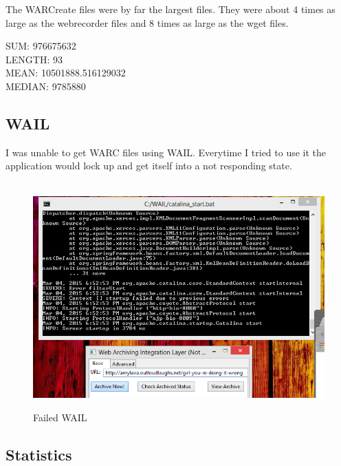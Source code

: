 \documentclass[12pt]{article}
\begin{document}
The WARCreate files were by far the largest files.  They were about 4 times as large as the webrecorder files and 8 times as large as the wget files.

\begin{center}
\noindent SUM:  976675632\\
LENGTH:  93\\
MEAN:  10501888.516129032\\
MEDIAN:  9785880
\end{center}

\subsection{WAIL}

I was unable to get WARC files using WAIL.  Everytime I tried to use it the application would lock up and get itself into a not responding state.

\begin{figure}[H]
    \caption{Failed WAIL}
    \centering
    \includegraphics{failwail.PNG}
\end{figure}

\subsection{Statistics}
\end{document}
